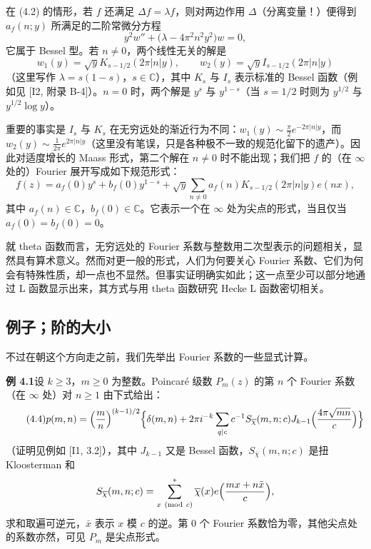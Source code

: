 在 (4.2) 的情形，若 $f$ 还满足 $\Delta f=\lambda f$，则对两边作用 $\Delta$（分离变量！）便得到 $a_{f}(n;y)$ 所满足的二阶常微分方程
\[
y^{2}w''+\bigl(\lambda-4\pi^{2}n^{2}y^{2}\bigr)w=0,
\]
它属于 Bessel 型。若 $n\ne0$，两个线性无关的解是
\[
w_{1}(y)=\sqrt{y}K_{s-1/2}(2\pi|n|y),\qquad
w_{2}(y)=\sqrt{y}I_{s-1/2}(2\pi|n|y)
\]
（这里写作 $\lambda=s(1-s)$，$s\in\mathbb{C}$），其中 $K_{s}$ 与 $I_{s}$ 表示标准的 Bessel 函数（例如见 [I2, 附录 B-4]）。$n=0$ 时，两个解是 $y^{s}$ 与 $y^{1-s}$（当 $s=1/2$ 时则为 $y^{1/2}$ 与 $y^{1/2}\log y$）。

重要的事实是 $I_{s}$ 与 $K_{s}$ 在无穷远处的渐近行为不同：$w_{1}(y)\sim\frac{\pi}{2}e^{-2\pi|n|y}$，而 $w_{2}(y)\sim\frac{1}{2\pi}e^{2\pi|n|y}$（这里没有笔误，只是各种极不一致的规范化留下的遗产）。因此对适度增长的 Maass 形式，第二个解在 $n\ne0$ 时不能出现；我们把 $f$ 的（在 $\infty$ 处的）Fourier 展开写成如下规范形式：
\begin{equation}\tag{4.3}\label{c3:eq:4.3}
f(z)=a_{f}(0)y^{s}+b_{f}(0)y^{1-s}+\sqrt{y}\sum_{n\ne0}a_{f}(n)K_{s-1/2}(2\pi|n|y)e(nx),
\end{equation}
其中 $a_{f}(n)\in\mathbb{C}$，$b_{f}(0)\in\mathbb{C}$。它表示一个在 $\infty$ 处为尖点的形式，当且仅当 $a_{f}(0)=b_{f}(0)=0$。

就 theta 函数而言，无穷远处的 Fourier 系数与整数用二次型表示的问题相关，显然具有算术意义。然而对更一般的形式，人们为何要关心 Fourier 系数、它们为何会有特殊性质，却一点也不显然。但事实证明确实如此；这一点至少可以部分地通过 L 函数显示出来，其方式与用 theta 函数研究 Hecke L 函数密切相关。

\subsection{例子；阶的大小}\label{c3:sec:4.2}

不过在朝这个方向走之前，我们先举出 Fourier 系数的一些显式计算。

\par\medskip\noindent\textbf{例 4.1}\quad 设 $k\ge3$，$m\ge0$ 为整数。Poincaré 级数 $P_{m}(z)$ 的第 $n$ 个 Fourier 系数（在 $\infty$ 处）对 $n\ge1$ 由下式给出：
\begin{equation}\tag{4.4}\label{c3:eq:4.4}
p(m,n)=\Bigl(\frac{m}{n}\Bigr)^{(k-1)/2}\Bigl\{\delta(m,n)+2\pi i^{-k}\sum_{q\mid c}c^{-1}S_{\overline{\chi}}(m,n;c)J_{k-1}\Bigl(\frac{4\pi\sqrt{mn}}{c}\Bigr)\Bigr\}
\end{equation}
（证明见例如 [I1, 3.2]），其中 $J_{k-1}$ 又是 Bessel 函数，$S_{\overline{\chi}}(m,n;c)$ 是扭 Kloosterman 和
\[
S_{\overline{\chi}}(m,n;c)=\sum_{x\ (\mathrm{mod}\ c)}^{*}\overline{\chi}(x)e\Bigl(\frac{mx+n\bar x}{c}\Bigr),
\]
求和取遍可逆元，$\bar x$ 表示 $x$ 模 $c$ 的逆。第 $0$ 个 Fourier 系数恰为零，其他尖点处的系数亦然，可见 $P_{m}$ 是尖点形式。

